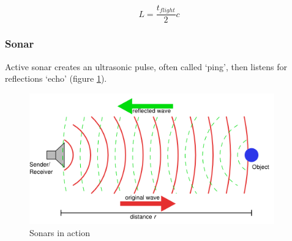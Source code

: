 \[
L = \frac{t_{flight}}{2}c
\]


  

\subsubsection{Sonar}
\label{sec:mobile:sonar}

Active sonar creates an ultrasonic pulse, often called `ping',
then listens for reflections `echo' (figure \ref{fig:sonar}).

\begin{figure}
  \begin{center}
    \includegraphics[width=300pt]{img/sonar.png}
    \caption{Sonars in action}
    \label{fig:sonar}
  \end{center}
\end{figure}


